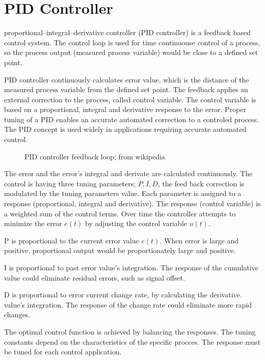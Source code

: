 \documentclass[\main/master.tex]{subfiles}
\begin{document}
\section{PID Controller}
proportional–integral–derivative controller (PID controller) is a feedback based control system. The control loop is used for time continuouse control of a process, so the process output (measured process variable) would be close to a defined set point.
\par
PID controller continuously calculates error value, which is the distance of the measured process variable from the defined set point. The feedback applies an external correction to the process, called control variable. The control variable is based on a proportional, integral and derivative response to the error. Proper tuning of a PID enables an accurate automated correction to a controled process. The PID concept is used widely in applications requiring accurate automated control.
\par
\begin{figure}[htbp]
	\centering
	\caption[PID]{PID controller feedback loop; from wikipedia}
	\label{fig:PID_scheme}
\end{figure}



\par
The error and the error's integral and derivate are calculated continuously. The control is having three tuning parameters; $P, I, D$, the feed back correction is modulated by the tuning parameters value. Each parameter is assigned to a response (proportional, integral and derivative). The response (control variable) is a weighted sum of the control terms. Over time the controller attempts to minimize the error $e(t)$ by adjusting the control variable $u(t)$.
\par
P is proportional to the current error value $e(t)$. When error is large and positive, proportional output would be proportionately large and positive.
\par
I is proportional to past error value's integration. The response of the cumulative value could eliminate residual errors, such as signal offset.
\par
D is proportional to error current change rate, by calculating the derivative. value's integration. The response of the change rate could eliminate more rapid changes.
\par
The optimal control function is achieved by balancing the responses. The tuning constants depend on the characteristics of the specific procces. The response must be tuned for each control application.  
\end{document}
